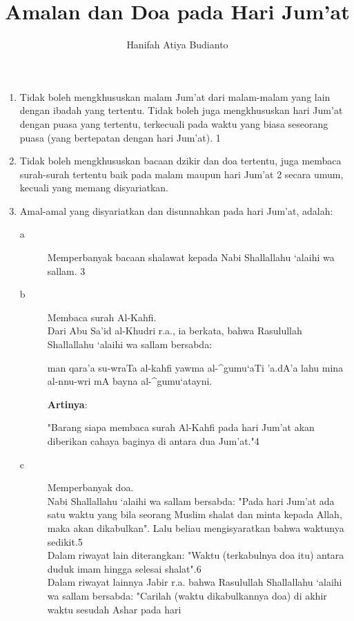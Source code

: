 \documentclass[a4paper,12pt]{article}
\title{\Large Amalan dan Doa pada Hari Jum'at}
\author{\calligra Hanifah Atiya Budianto}
\begin{document}
\sffamily
\maketitle 
\fullvocalize
{}
\par
\indent
\begin{enumerate}
\item Tidak boleh mengkhususkan malam Jum'at dari malam-malam yang lain 
dengan ibadah yang tertentu. Tidak boleh juga mengkhususkan hari Jum'at 
dengan puasa yang tertentu, terkecuali pada waktu yang biasa seseorang 
puasa (yang bertepatan dengan hari Jum'at). {\scriptsize 1}
\item Tidak boleh mengkhususkan bacaan dzikir dan doa tertentu, juga 
membaca surah-surah tertentu baik pada malam maupun hari Jum'at 
{\scriptsize 2} secara umum, kecuali yang memang disyariatkan.
\item Amal-amal yang disyariatkan dan disunnahkan pada hari Jum'at, 
adalah:
\begin{description}
\item[a]Memperbanyak bacaan shalawat kepada Nabi Shallallahu ‘alaihi wa 
sallam. {\scriptsize 3}
\item[b]Membaca surah Al-Kahfi.\\
\indent Dari Abu Sa'id al-Khudri r.a., ia berkata, bahwa Rasulullah 
Shallallahu ‘alaihi wa sallam bersabda: 
\begin{arabtext}
\noindent
man qara'a su-wraTa al-kahfi yawma al-^gumu`aTi 'a.dA'a lahu mina 
al-nnu-wri mA bayna al-^gumu`atayni.\\
\end{arabtext}
\noindent
\textbf{Artinya}:
\par
\indent
"Barang siapa membaca surah Al-Kahfi pada hari Jum'at akan diberikan cahaya
baginya di antara dua Jum'at."{\scriptsize 4}\\
\item[c]Memperbanyak doa.\\
\indent Nabi Shallallahu ‘alaihi wa sallam bersabda: "Pada hari Jum'at ada satu waktu yang bila seorang Muslim shalat dan minta kepada Allah, maka akan dikabulkan". Lalu beliau mengisyaratkan bahwa waktunya sedikit.{\scriptsize 5}\\
\indent Dalam riwayat lain diterangkan: "Waktu (terkabulnya doa itu) antara
duduk imam hingga selesai shalat".{\scriptsize 6}\\
\indent Dalam riwayat lainnya Jabir r.a. bahwa Rasulullah Shallallahu ‘alaihi wa sallam bersabda: 
"Carilah (waktu dikabulkannya doa) di akhir waktu sesudah Ashar pada hari 

\end{description}
\end{enumerate}
\end{document}
